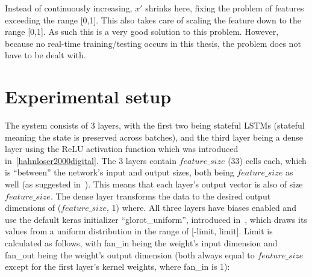 Instead of continuously increasing, \(x'\) shrinks here, fixing the problem of features exceeding the range [0,1]. This also takes care of scaling the feature down to the range [0,1]. As such this is a very good solution to this problem. However, because no real-time training/testing occurs in this thesis, the problem does not have to be dealt with.












\section{Experimental setup}
The system consists of 3 layers, with the first two being stateful LSTMs (stateful meaning the state is preserved across batches), and the third layer being a dense layer using the ReLU activation function which was introduced in~\ref{hahnloser2000digital}. The 3 layers contain \(feature\_size\) (33) cells each, which is \enquote{between} the network's input and output sizes, both being \(feature\_size\) as well (as suggested in~\cite{heaton2008introduction}). This means that each layer's output vector is also of size \(feature\_size\). The dense layer transforms the data to the desired output dimensions of (\(feature\_size\), 1) where. All three layers have biases enabled and use the default keras initializer \enquote{glorot\_uniform}, introduced in~\cite{glorot2010understanding}, which draws its values from a uniform distribution in the range of [-limit, limit]. Limit is calculated as follows, with fan\_in being the weight's input dimension and fan\_out being the weight's output dimension (both always equal to \(feature\_size\) except for the first layer's kernel weights, where fan\_in is 1):

